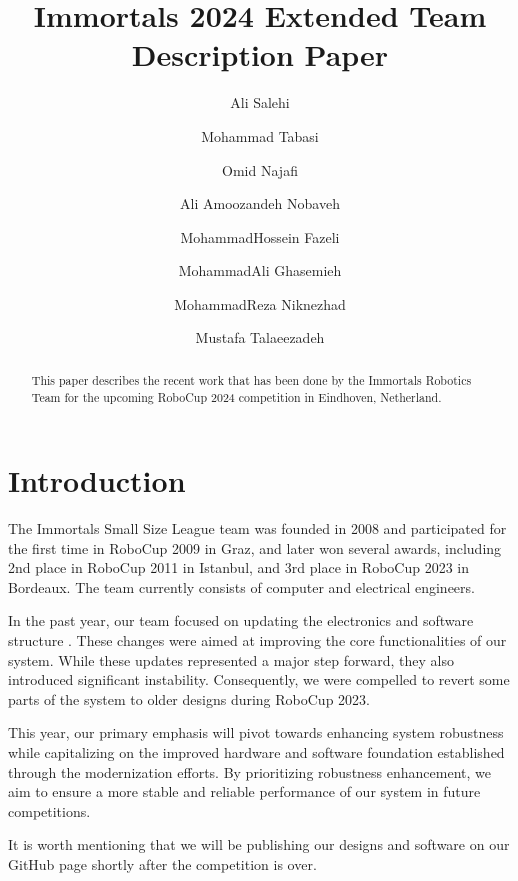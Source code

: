\documentclass[runningheads]{llncs}
\begin{document}
%
\title{Immortals 2024 Extended Team Description Paper}

\author{Ali Salehi \and
Mohammad Tabasi \and
Omid Najafi \and
Ali Amoozandeh Nobaveh \and
MohammadHossein Fazeli \and
MohammadAli Ghasemieh \and
MohammadReza Niknezhad \and
Mustafa Talaeezadeh}
%
%
%
\maketitle              %
%
\begin{abstract}
This paper describes the recent work that has been done by the Immortals Robotics Team for the upcoming RoboCup 2024 competition in Eindhoven, Netherland.

\end{abstract}

\section{Introduction}
The Immortals Small Size League team was founded in 2008 and participated for the first time in RoboCup 2009 in Graz, and later won several awards, including 2nd place in RoboCup 2011 in Istanbul, and 3rd place in RoboCup 2023 in Bordeaux. The team currently consists of computer and electrical engineers.


In the past year, our team focused on updating the electronics and software structure \cite{ref_ETDP2023}. These changes were aimed at improving the core functionalities of our system. While these updates represented a major step forward, they also introduced significant instability. Consequently, we were compelled to revert some parts of the system to older designs during RoboCup 2023.

This year, our primary emphasis will pivot towards enhancing system robustness while capitalizing on the improved hardware and software foundation established through the modernization efforts. By prioritizing robustness enhancement, we aim to ensure a more stable and reliable performance of our system in future competitions.
 
It is worth mentioning that we will be publishing our designs and software on our GitHub page \cite{ref_github} shortly after the competition is over.
\end{document}
